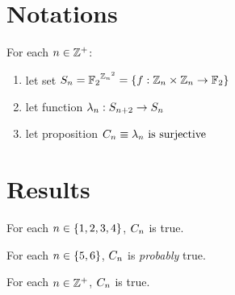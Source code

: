 \documentclass{paper}
\begin{document}

\begin{center}
\Large{\mytitle}
\end{center}

\tableofcontents

\begin{flushleft}


\section{Notations}

For each $n \in \mathbb{Z}^+$:
\begin{enumerate}
\item let set $S_{n} = {\mathbb{F}_2}^{{\mathbb{Z}_n}^2} =
  \{f: \mathbb{Z}_n \times \mathbb{Z}_n \to \mathbb{F}_2\}$
\item let function $\lambda_{n}: S_{n+2} \to S_{n}$
\item let proposition $C_{n} \equiv \lambda_{n}
  \text{ is surjective}$
\end{enumerate}


\section{Results}

\begin{remark}
For each $n \in \{1, 2, 3, 4\}$, $C_{n}$ is true.
\end{remark}

\begin{remark}
For each $n \in \{5, 6\}$, $C_{n}$ is \emph{probably} true.
\end{remark}

\begin{conjecture}
For each $n \in \mathbb{Z}^+$, $C_{n}$ is true.
\end{conjecture}


\end{flushleft}
\end{document}
